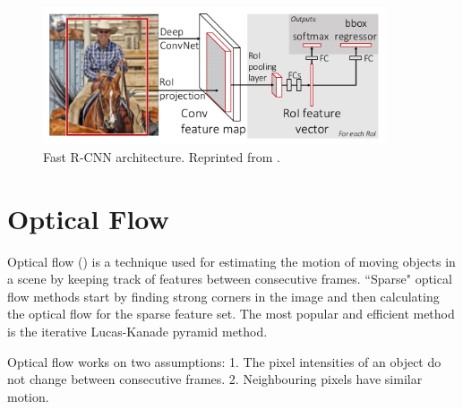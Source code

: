 \begin{figure}[t]
  \centering
  \includegraphics[width=4in]{figures/fastrcnn.jpg}  
  \caption[FAST R-CNNs]{Fast R-CNN architecture. Reprinted from . }
  \label{fig:fastrcnn}
\end{figure}


\section{Optical Flow} 
\label{Optical Flow}
Optical flow () is a technique used for estimating the motion of moving objects in a scene by keeping track of features between consecutive frames. \textquotedblleft Sparse" optical flow methods start by finding strong corners in the image and then calculating the optical flow for the sparse feature set. The most popular and efficient method is the iterative Lucas-Kanade pyramid method.

Optical flow works on two assumptions:\newline
\tab \hspace{8mm}1. The pixel intensities of an object do not change between consecutive frames.\newline
\tab \hspace{8mm}2. Neighbouring pixels have similar motion.

